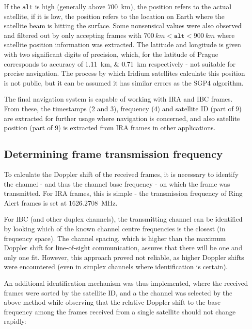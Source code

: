If the \texttt{alt} is high (generally above \qty{700}{km}), the position refers to the actual satellite, if it is low, the position refers to the location on Earth where the satellite beam is hitting the surface.
Some nonsensical values were also observed and filtered out by only accepting frames with $\qty{700}{km} < \texttt{alt} < \qty{900}{km}$ where satellite position information was extracted. The latitude and longitude is given with two significant digits of precision, which, for the latitude of Prague corresponds to accuracy of \qtylist{1.11; 0.71}{km} respectively - not suitable for precise navigation. The process by which Iridium satellites calculate this position is not public, but it can be assumed it has similar errors as the SGP4 algorithm.

The final navigation system is capable of working with IRA and IBC frames. From these, the timestamps (2 and 3), frequency (4) and satellite ID (part of 9) are extracted for further usage where navigation is concerned, and also satellite position (part of 9) is extracted from IRA frames in other applications.

\subsection{Determining frame transmission frequency}
To calculate the Doppler shift of the received frames, it is necessary to identify the channel - and thus the channel base frequency -  on which the frame was transmitted. For IRA frames, this is simple - the transmission frequency of Ring Alert frames is set at \qty{1626.2708}{MHz}. 

For IBC (and other duplex channels), the transmitting channel can be identified by looking which of the known channel centre frequencies is the closest (in frequency space). The channel spacing, which is higher than the maximum Doppler shift for line-of-sight communication, assures that there will be one and only one fit. However, this approach proved not reliable, as higher Doppler shifts were encountered (even in simplex channels where identification is certain).

An additional identification mechanism was thus implemented, where the received frames were sorted by the satellite ID, and a the channel was selected by the above method while observing that the relative Doppler shift to the base frequency among the frames received from a single satellite should not change rapidly:

